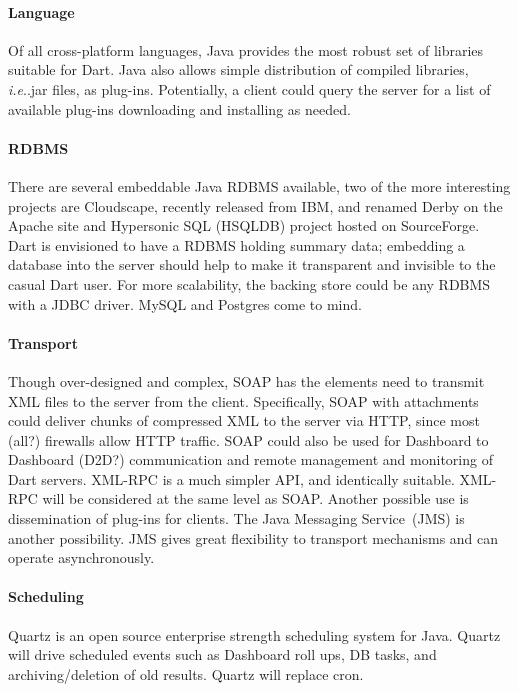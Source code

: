 \documentclass{InsightBook}
\makeatletter
\DeclareRobustCommand\onedot{\futurelet\@let@token\@onedot}
\def\@onedot{\ifx\@let@token.\else.\xspace\fi}
\def\ie{\emph{i.e}\onedot} \def\Ie{\emph{I.e}\onedot}
\makeatother
\begin{document}
\paragraph{Language}
Of all cross-platform languages, Java provides the most robust set of libraries suitable for
Dart.  Java also allows simple distribution of compiled libraries,
\ie jar files, as plug-ins.  Potentially, a client could query
the server for a list of available plug-ins downloading and installing
as needed.

\paragraph{RDBMS}
There are several embeddable Java RDBMS available,
two of the more interesting projects are Cloudscape, recently released
from IBM, and renamed Derby on the Apache site and Hypersonic SQL
(HSQLDB) project hosted on SourceForge.  Dart is envisioned to have a
RDBMS holding summary data; embedding a database into the server
should help to make it transparent and invisible to the casual Dart
user.  For more scalability, the backing store could be any
RDBMS with a JDBC driver.  MySQL and Postgres come to mind.

\paragraph{Transport} 
Though over-designed and complex, SOAP has the elements need to
transmit XML files to the server from the client.  Specifically, SOAP
with attachments could deliver chunks of compressed XML to the server
via HTTP, since most (all?) firewalls allow HTTP traffic. SOAP could
also be used for Dashboard to Dashboard (D2D?)  communication and
remote management and monitoring of Dart servers.  XML-RPC is a much
simpler API, and identically suitable.  XML-RPC will be considered at
the same level as SOAP. Another possible use is dissemination of
plug-ins for clients.  The Java Messaging Service~(JMS) is another
possibility.  JMS gives great flexibility to transport mechanisms and
can operate asynchronously.

\paragraph{Scheduling}
Quartz is an open source enterprise strength
scheduling system for Java.  Quartz will drive scheduled events such
as Dashboard roll ups, DB tasks, and archiving/deletion of old
results.  Quartz will replace cron.
\end{document}
